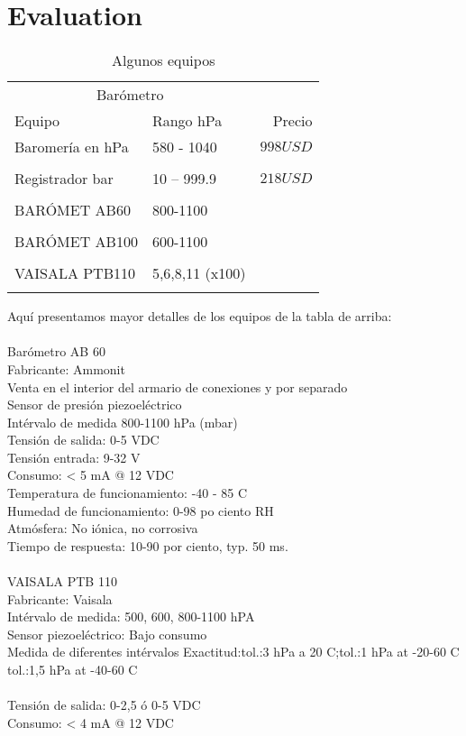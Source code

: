\section{Evaluation}

\begin{table}[H]
	\caption{Algunos equipos}
	\centering
	\begin{tabular}{llr}
		\toprule
		\multicolumn{2}{c}{Barómetro} \\
		\cmidrule(r){1-2}
		Equipo & Rango hPa& Precio  \\
		\midrule
		
		Baromería en hPa & 580 - 1040& $998USD$ \\\\
		Registrador bar & 10 – 999.9 & $218USD$ \\\\
		BARÓMET AB60 & 800-1100&$$\\\\
		BARÓMET AB100 &600-1100&\\\\
		VAISALA PTB110 &5,6,8,11 (x100)&\\\\
		\bottomrule
	\end{tabular}
\end{table}

Aquí presentamos mayor detalles de los equipos de la tabla de arriba:\\\\

Barómetro AB 60\\
Fabricante: Ammonit\\
Venta en el interior del armario de conexiones y por separado\\
Sensor de presión piezoeléctrico\\
Intérvalo de medida 800-1100 hPa (mbar)\\
Tensión de salida: 0-5 VDC\\Tensión entrada: 9-32 V\\
Consumo: < 5 mA @ 12 VDC\\
Temperatura de funcionamiento: -40 - 85 C\\
Humedad de funcionamiento: 0-98 po ciento RH\\
Atmósfera: No iónica, no corrosiva\\
Tiempo de respuesta: 10-90 por ciento, typ. 50 ms.\\\\

VAISALA PTB 110\\
Fabricante: Vaisala\\
Intérvalo de medida: 500, 600, 800-1100 hPA\\
Sensor piezoeléctrico: Bajo consumo\\
Medida de diferentes intérvalos
Exactitud:tol.:3 hPa a 20 C;tol.:1 hPa at -20-60 C tol.:1,5 hPa at -40-60 C\\\\
Tensión de salida: 0-2,5 ó 0-5 VDC\\
Consumo: < 4 mA @ 12 VDC\\